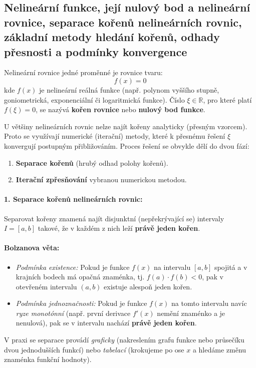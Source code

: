\subsection{Nelineární funkce, její nulový bod a nelineární rovnice, separace kořenů nelineárních rovnic, základní metody hledání kořenů, odhady přesnosti a podmínky konvergence}

Nelineární rovnice jedné proměnné je rovnice tvaru:
\[ f(x) = 0 \]
kde $f(x)$ je nelineární reálná funkce (např. polynom vyššího stupně, goniometrická, exponenciální či logaritmická funkce). Číslo $\xi \in \mathbb{R}$, pro které platí $f(\xi) = 0$, se nazývá \textbf{kořen rovnice} nebo \textbf{nulový bod funkce}.

U většiny nelineárních rovnic nelze najít kořeny analyticky (přesným vzorcem). Proto se využívají numerické (iterační) metody, které k přesnému řešení $\xi$ konvergují postupným přibližováním. Proces řešení se obvykle dělí do dvou fází:
\begin{enumerate}
    \item \textbf{Separace kořenů} (hrubý odhad polohy kořenů).
    \item \textbf{Iterační zpřesňování} vybranou numerickou metodou.
\end{enumerate}


\paragraph*{1. Separace kořenů nelineárních rovnic:}
Separovat kořeny znamená najít disjunktní (nepřekrývající se) intervaly $I = [a, b]$ takové, že v každém z nich leží \textbf{právě jeden kořen}. 

\paragraph*{Bolzanova věta:}
\begin{itemize}
    \item \textit{Podmínka existence:} Pokud je funkce $f(x)$ na intervalu $[a, b]$ spojitá a v krajních bodech má opačná znaménka, tj. $f(a) \cdot f(b) < 0$, pak v otevřeném intervalu $(a, b)$ existuje alespoň jeden kořen.
    \item \textit{Podmínka jednoznačnosti:} Pokud je funkce $f(x)$ na tomto intervalu navíc \textit{ryze monotónní} (např. první derivace $f'(x)$ nemění znaménko a je nenulová), pak se v intervalu nachází \textbf{právě jeden kořen}.
\end{itemize}
V praxi se separace provádí \textit{graficky} (nakreslením grafu funkce nebo průsečíku dvou jednodušších funkcí) nebo \textit{tabelací} (krokujeme po ose $x$ a hledáme změnu znaménka funkční hodnoty).

